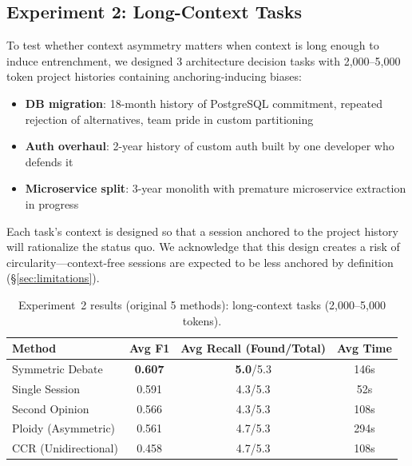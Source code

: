 \documentclass[11pt]{article}
\begin{document}
\subsection{Experiment 2: Long-Context Tasks}
\label{sec:exp2}

To test whether context asymmetry matters when context is long enough to induce entrenchment, we designed 3 architecture decision tasks with 2,000--5,000 token project histories containing anchoring-inducing biases:

\begin{itemize}[leftmargin=1.5em]
  \item \textbf{DB migration}: 18-month history of PostgreSQL commitment, repeated rejection of alternatives, team pride in custom partitioning
  \item \textbf{Auth overhaul}: 2-year history of custom auth built by one developer who defends it
  \item \textbf{Microservice split}: 3-year monolith with premature microservice extraction in progress
\end{itemize}

Each task's context is designed so that a session anchored to the project history will rationalize the status quo. We acknowledge that this design creates a risk of circularity---context-free sessions are expected to be less anchored by definition (\S\ref{sec:limitations}).

\begin{table}[t]
\centering
\caption{Experiment~2 results (original 5 methods): long-context tasks (2,000--5,000 tokens).}
\label{tab:exp2}
\small
\begin{tabular}{@{}lccc@{}}
\toprule
\textbf{Method} & \textbf{Avg F1} & \textbf{Avg Recall (Found/Total)} & \textbf{Avg Time} \\
\midrule
Symmetric Debate       & \textbf{0.607} & \textbf{5.0}/5.3 & 146s \\
Single Session         & 0.591          & 4.3/5.3            & 52s  \\
Second Opinion         & 0.566          & 4.3/5.3            & 108s \\
Ploidy (Asymmetric)    & 0.561          & 4.7/5.3            & 294s \\
CCR (Unidirectional)   & 0.458          & 4.7/5.3            & 108s \\
\bottomrule
\end{tabular}
\end{table}
\end{document}
